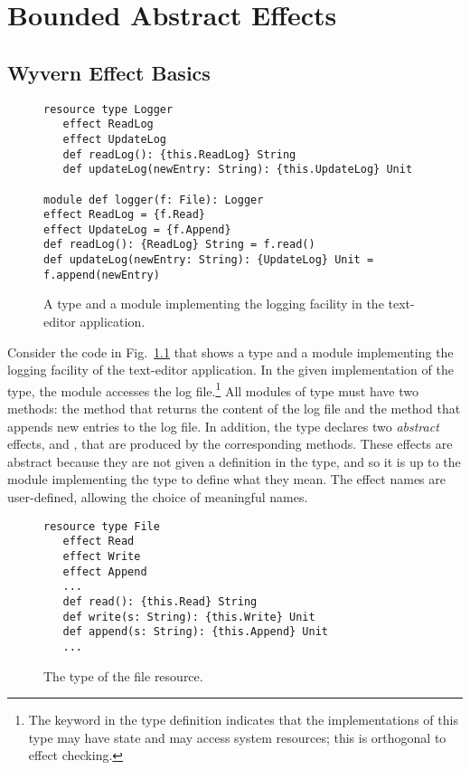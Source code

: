 \chapter{Bounded Abstract Effects}

\section{Wyvern Effect Basics}
\label{sec:wyvern-effects-basics}

\begin{figure}[t]
\begin{lstlisting}
resource type Logger
   effect ReadLog
   effect UpdateLog
   def readLog(): {this.ReadLog} String
   def updateLog(newEntry: String): {this.UpdateLog} Unit

module def logger(f: File): Logger
effect ReadLog = {f.Read}
effect UpdateLog = {f.Append}
def readLog(): {ReadLog} String = f.read()
def updateLog(newEntry: String): {UpdateLog} Unit = f.append(newEntry)
\end{lstlisting}
\caption{A type and a module implementing the logging facility in the text-editor application.}
\label{f-logger}
\end{figure}

Consider the code in Fig.~\ref{f-logger} that shows a type and a module implementing the logging facility of the text-editor application.  In the given implementation of the  type, the  module accesses the log file.\footnote{The keyword  in the type definition indicates that the implementations of this type may have state and may access system resources; this is orthogonal to effect checking.} All modules of type  must have two methods: the  method that returns the content of the log file and the  method that appends new entries to the log file. In addition, the  type declares two \textit{abstract} effects,  and , that are produced by the corresponding methods. These effects are abstract because they are not given a definition in the  type, and so it is up to the module implementing the  type to define what they mean. The effect names are user-defined, allowing the choice of meaningful names.

\begin{figure}[t]
\begin{lstlisting}
resource type File
   effect Read
   effect Write
   effect Append
   ...
   def read(): {this.Read} String
   def write(s: String): {this.Write} Unit
   def append(s: String): {this.Append} Unit
   ...
\end{lstlisting}
\caption{The type of the file resource.}
\label{f-file}
\end{figure}


